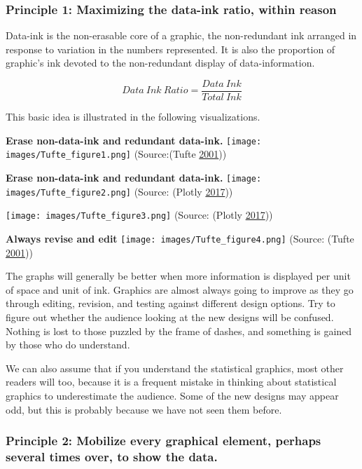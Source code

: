 \documentclass[]{book}
\begin{document}
\hypertarget{principle-1-maximizing-the-data-ink-ratio-within-reason}{%
\subsubsection{Principle 1: Maximizing the data-ink ratio, within reason}\label{principle-1-maximizing-the-data-ink-ratio-within-reason}}

Data-ink is the non-erasable core of a graphic, the non-redundant ink arranged in response to variation in the numbers represented. It is also the proportion of graphic's ink devoted to the non-redundant display of data-information.

\[{Data \ Ink \ Ratio} = \frac{{Data \ Ink}}{{Total \ Ink}}\]

This basic idea is illustrated in the following visualizations.

\textbf{Erase non-data-ink and redundant data-ink.}
\texttt{[image: images/Tufte\_figure1.png]}
(Source:(Tufte \protect\hyperlink{ref-Tufte_2001}{2001}))

\textbf{Erase non-data-ink and redundant data-ink.}
\texttt{[image: images/Tufte\_figure2.png]}
(Source: (Plotly \protect\hyperlink{ref-appli_2017}{2017}))

\texttt{[image: images/Tufte\_figure3.png]}
(Source: (Plotly \protect\hyperlink{ref-appli_2017}{2017}))

\textbf{Always revise and edit}
\texttt{[image: images/Tufte\_figure4.png]}
(Source: (Tufte \protect\hyperlink{ref-Tufte_2001}{2001}))

The graphs will generally be better when more information is displayed per unit of space and unit of ink. Graphics are almost always going to improve as they go through editing, revision, and testing against different design options. Try to figure out whether the audience looking at the new designs will be confused. Nothing is lost to those puzzled by the frame of dashes, and something is gained by those who do understand.

We can also assume that if you understand the statistical graphics, most other readers will too, because it is a frequent mistake in thinking about statistical graphics to underestimate the audience. Some of the new designs may appear odd, but this is probably because we have not seen them before.

\hypertarget{principle-2-mobilize-every-graphical-element-perhaps-several-times-over-to-show-the-data.}{%
\subsubsection{Principle 2: Mobilize every graphical element, perhaps several times over, to show the data.}\label{principle-2-mobilize-every-graphical-element-perhaps-several-times-over-to-show-the-data.}}
\end{document}
